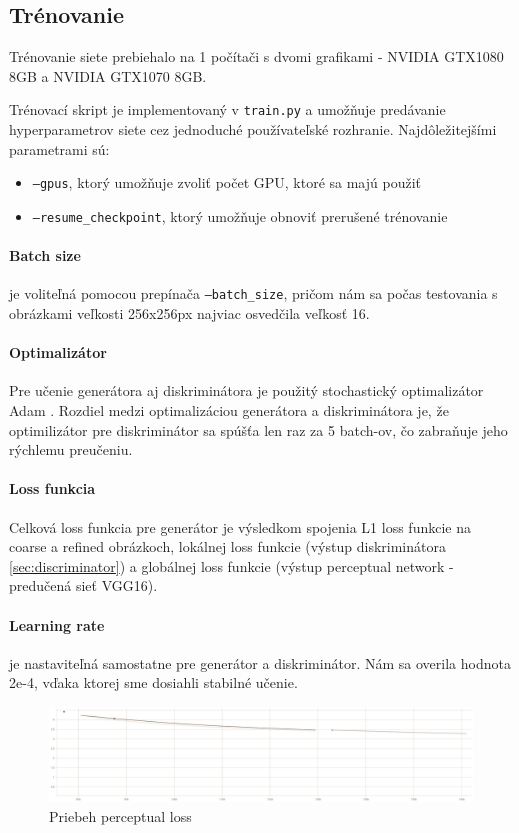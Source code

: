 \documentclass [11pt, a4paper]{article}
\begin{document}
	\subsection{Trénovanie}
	Trénovanie siete prebiehalo na 1 počítači s dvomi grafikami - NVIDIA GTX1080 8GB a NVIDIA GTX1070 8GB.
	
	Trénovací skript je implementovaný v \texttt{train.py} a umožňuje predávanie hyperparametrov siete cez jednoduché používateľské rozhranie. Najdôležitejšími parametrami sú:
	\begin{itemize}
		\item \texttt{--gpus}, ktorý umožňuje zvoliť počet GPU, ktoré sa majú použiť
		\item \texttt{--resume\_checkpoint}, ktorý umožňuje obnoviť prerušené trénovanie
	\end{itemize}
	
	\paragraph{Batch size} je voliteľná pomocou prepínača \texttt{--batch\_size}, pričom nám sa počas testovania s obrázkami veľkosti 256x256px najviac osvedčila veľkosť 16.
	\paragraph{Optimalizátor} Pre učenie generátora aj diskriminátora je použitý stochastický optimalizátor Adam \cite{kingma2017adam}. Rozdiel medzi optimalizáciou generátora a diskriminátora je, že optimilizátor pre diskriminátor sa spúšťa len raz za 5 batch-ov, čo zabraňuje jeho rýchlemu preučeniu.
	\paragraph{Loss funkcia} Celková loss funkcia pre generátor je výsledkom spojenia L1 loss funkcie na coarse a refined obrázkoch, lokálnej loss funkcie (výstup diskriminátora \ref{sec:discriminator}) a globálnej loss funkcie (výstup perceptual network - predučená sieť VGG16).
	\paragraph{Learning rate} je nastaviteľná samostatne pre generátor a diskriminátor. Nám sa overila hodnota 2e-4, vďaka ktorej sme dosiahli stabilné učenie.
	
	\begin{figure}[h]
		\centering
		\includegraphics[width=1\linewidth]{img/validation-perceptual-loss-progress}
		\caption{Priebeh perceptual loss}
		\label{fig:validation-perceptual-loss-progress}
	\end{figure}
	
\end{document}
